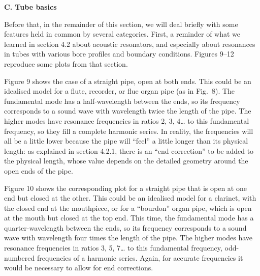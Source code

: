   \textbf{C. Tube basics} 

  Before that, in the remainder of this section, we will deal briefly with some 
  features held in common by several categories. First, a reminder of what we 
  learned in section 4.2 about acoustic resonators, and especially about 
  resonances in tubes with various bore profiles and boundary conditions. 
  Figures 9--12 reproduce some plots from that section. 

  Figure 9 shows the case of a straight pipe, open at both ends. This could be 
  an idealised model for a flute, recorder, or flue organ pipe (as in Fig.\ 8). 
  The fundamental mode has a half-wavelength between the ends, so its frequency 
  corresponds to a sound wave with wavelength twice the length of the pipe. The 
  higher modes have resonance frequencies in ratios 2, 3, 4… to this 
  fundamental frequency, so they fill a complete harmonic series. In reality, 
  the frequencies will all be a little lower because the pipe will “feel” a 
  little longer than its physical length: as explained in section 4.2.1, there 
  is an “end correction” to be added to the physical length, whose value 
  depends on the detailed geometry around the open ends of the pipe. 


  Figure 10 shows the corresponding plot for a straight pipe that is open at 
  one end but closed at the other. This could be an idealised model for a 
  clarinet, with the closed end at the mouthpiece, or for a “bourdon” organ 
  pipe, which is open at the mouth but closed at the top end. This time, the 
  fundamental mode has a quarter-wavelength between the ends, so its frequency 
  corresponds to a sound wave with wavelength four times the length of the 
  pipe. The higher modes have resonance frequencies in ratios 3, 5, 7… to this 
  fundamental frequency, odd-numbered frequencies of a harmonic series. Again, 
  for accurate frequencies it would be necessary to allow for end corrections. 


